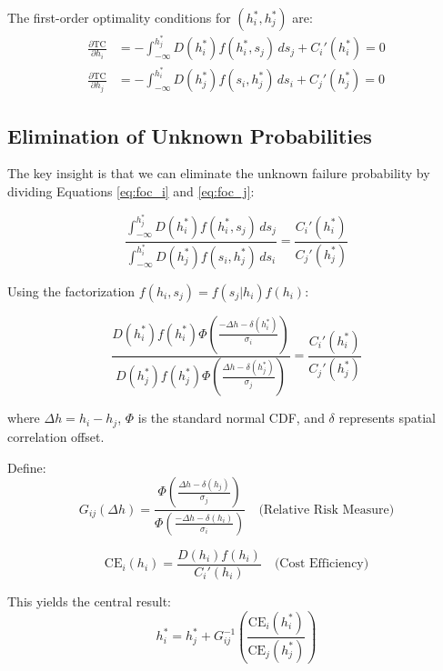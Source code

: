 \documentclass[3p,twocolumn]{elsarticle}
\begin{document}
The first-order optimality conditions for $(h_i^*, h_j^*)$ are:
\begin{align}
\frac{\partial \text{TC}}{\partial h_i} &= -\int_{-\infty}^{h_j^*} D(h_i^*) f(h_i^*, s_j) \, ds_j + C_i'(h_i^*) = 0 \label{eq:foc_i}\\
\frac{\partial \text{TC}}{\partial h_j} &= -\int_{-\infty}^{h_i^*} D(h_j^*) f(s_i, h_j^*) \, ds_i + C_j'(h_j^*) = 0 \label{eq:foc_j}
\end{align}

\subsection{Elimination of Unknown Probabilities}

The key insight is that we can eliminate the unknown failure probability by dividing Equations \eqref{eq:foc_i} and \eqref{eq:foc_j}:

\begin{equation}
\frac{\int_{-\infty}^{h_j^*} D(h_i^*) f(h_i^*, s_j) \, ds_j}{\int_{-\infty}^{h_i^*} D(h_j^*) f(s_i, h_j^*) \, ds_i} = \frac{C_i'(h_i^*)}{C_j'(h_j^*)}
\label{eq:ratio}
\end{equation}

Using the factorization $f(h_i, s_j) = f(s_j | h_i) f(h_i)$:

\begin{equation}
\frac{D(h_i^*) f(h_i^*) \Phi\left(\frac{-\Delta h - \delta(h_i^*)}{\sigma_i}\right)}{D(h_j^*) f(h_j^*) \Phi\left(\frac{\Delta h - \delta(h_j^*)}{\sigma_j}\right)} = \frac{C_i'(h_i^*)}{C_j'(h_j^*)}
\label{eq:analytical}
\end{equation}

where $\Delta h = h_i - h_j$, $\Phi$ is the standard normal CDF, and $\delta$ represents spatial correlation offset.

Define:
\begin{equation}
G_{ij}(\Delta h) = \frac{\Phi\left(\frac{\Delta h - \delta(h_j)}{\sigma_j}\right)}{\Phi\left(\frac{-\Delta h - \delta(h_i)}{\sigma_i}\right)} \quad \text{(Relative Risk Measure)}
\label{eq:risk_measure}
\end{equation}

\begin{equation}
\text{CE}_i(h_i) = \frac{D(h_i) f(h_i)}{C_i'(h_i)} \quad \text{(Cost Efficiency)}
\label{eq:cost_efficiency}
\end{equation}

This yields the central result:
\begin{equation}
\boxed{h_i^* = h_j^* + G_{ij}^{-1}\left(\frac{\text{CE}_i(h_i^*)}{\text{CE}_j(h_j^*)}\right)}
\label{eq:main_result}
\end{equation}
\end{document}
